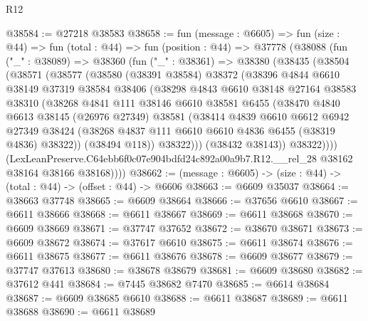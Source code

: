 \begin{lexlean}{R12}
\begin{coremodule}
@38584 := @27218 @38583
@38658 := fun (message : @6605) =>
  fun (size : @44) =>
  fun (total : @44) =>
  fun (position : @44) =>
  @37778
    (@38088
      (fun ("_" : @38089) =>
      @38360
        (fun ("_" : @38361) =>
        @38380
          (@38435
            (@38504
              (@38571
                (@38577
                  (@38580
                    (@38391 @38584)
                    @38372
                    (@38396
                      @4844
                      @6610
                      @38149
                      @37319
                      @38584
                      @38406
                      (@38298
                        @4843
                        @6610
                        @38148
                        @27164
                        @38583
                        @38310
                        (@38268
                          @4841
                          @111
                          @38146
                          @6610
                          @38581
                          @6455
                          (@38470
                            @4840
                            @6613
                            @38145
                            (@26976 @27349)
                            @38581
                            (@38414
                              @4839
                              @6610
                              @6612
                              @6942
                              @27349
                              @38424
                              (@38268 @4837 @111 @6610 @6610 @4836 @6455 (@38319 @4836) @38322))
                            (@38494 @118))
                          @38322)))
                    (@38432 @38143))
                  @38322))))
          (LexLeanPreserve.C64ebb6f0c07e904bdfd24c892a00a9b7.R12.__rel_28
            @38162
            @38164
            @38166
            @38168))))
@38662 := (message : @6605) -> (size : @44) -> (total : @44) -> (offset : @44) -> @6606
@38663 := @6609 @35037
@38664 := @38663 @37748
@38665 := @6609 @38664
@38666 := @37656 @6610
@38667 := @6611 @38666
@38668 := @6611 @38667
@38669 := @6611 @38668
@38670 := @6609 @38669
@38671 := @37747 @37652
@38672 := @38670 @38671
@38673 := @6609 @38672
@38674 := @37617 @6610
@38675 := @6611 @38674
@38676 := @6611 @38675
@38677 := @6611 @38676
@38678 := @6609 @38677
@38679 := @37747 @37613
@38680 := @38678 @38679
@38681 := @6609 @38680
@38682 := @37612 @441
@38684 := @7445 @38682 @7470
@38685 := @6614 @38684
@38687 := @6609 @38685 @6610
@38688 := @6611 @38687
@38689 := @6611 @38688
@38690 := @6611 @38689

\end{coremodule}
\end{lexlean}
